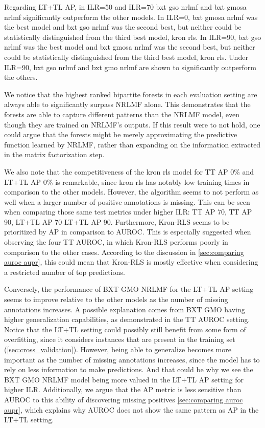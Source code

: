 Regarding LT+TL AP, in ILR=50 and ILR=70 bxt gso nrlmf and bxt gmosa nrlmf significantly outperform the other models. In ILR=0, bxt gmosa nrlmf was the best model and bxt gso nrlmf was the second best, but neither could be statistically distinguished from the third best model, kron rls. In ILR=90, bxt gso nrlmf was the best model and bxt gmosa nrlmf was the second best, but neither could be statistically distinguished from the third best model, kron rls. Under ILR=90, bxt gso nrlmf and bxt gmo nrlmf are shown to significantly outperform the others.

We notice that the highest ranked bipartite forests in each evaluation setting are always able to significantly surpass NRLMF alone. This demonstrates that the forests are able to capture different patterns than the NRLMF model, even though they are trained on NRLMF's outputs. If this result were to not hold, one could argue that the forests might be merely approximating the predictive function learned by NRLMF, rather than expanding on the information extracted in the matrix factorization step.

We also note that the competitiveness of the kron rls model for TT AP 0\% and LT+TL AP 0\% is remarkable, since kron rls has notably low training times in comparison to the other models.  %
However, the algorithm seems to not perform as well when a larger number of positive annotations is missing. This can be seen when comparing those same test metrics under higher ILR: TT AP 70, TT AP 90, LT+TL AP 70 LT+TL AP 90.
Furthermore, Kron-RLS seems to be prioritized by AP in comparison to AUROC. This is especially suggested when observing the four TT AUROC, in which Kron-RLS performs poorly in comparison to the other cases.
According to the discussion in \autoref{sec:comparing auroc aupr}, this could mean that Kron-RLS is mostly effective when considering a restricted number of top predictions.

Conversely, the performance of BXT GMO NRLMF for the LT+TL AP setting seems to improve relative to the other models as the number of missing annotations increases. A possible explanation comes from BXT GMO having higher generalization capabilities, as demonstrated in the TT AUROC setting. Notice that the LT+TL setting could possibly still benefit from some form of overfitting, since it considers instances that are present in the training set (\autoref{sec:cross_validation}). However, being able to generalize becomes more important as the number of missing annotations increases, since the model has to rely on less information to make predictions. And that could be why we see the BXT GMO NRLMF model being more valued in the LT+TL AP setting for higher ILR.
Additionally, we argue that the AP metric is less sensitive than AUROC to this ability of discovering missing positives \autoref{sec:comparing auroc aupr}, which explains why AUROC does not show the same pattern as AP in the LT+TL setting.

